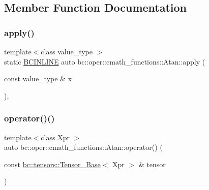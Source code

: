 \subsection{Member Function Documentation}
\mbox{\label{structbc_1_1oper_1_1cmath__functions_1_1Atan_a8ee1b987b30be5bd14dfd71f6f112fbe}} 
\subsubsection{\texorpdfstring{apply()}{apply()}}
{\footnotesize\ttfamily template$<$class value\+\_\+type $>$ \\
static \hyperlink{common_8h_a6699e8b0449da5c0fafb878e59c1d4b1}{B\+C\+I\+N\+L\+I\+NE} auto bc\+::oper\+::cmath\+\_\+functions\+::\+Atan\+::apply (\begin{DoxyParamCaption}\item[{const value\+\_\+type \&}]{x }\end{DoxyParamCaption})\hspace{0.3cm}{\ttfamily [inline]}, {\ttfamily [static]}}

\mbox{\label{structbc_1_1oper_1_1cmath__functions_1_1Atan_a8886ec51e68cc92caba84b031d3acdf9}} 
\subsubsection{\texorpdfstring{operator()()}{operator()()}\hspace{0.1cm}{\footnotesize\ttfamily [1/3]}}
{\footnotesize\ttfamily template$<$class Xpr $>$ \\
auto bc\+::oper\+::cmath\+\_\+functions\+::\+Atan\+::operator() (\begin{DoxyParamCaption}\item[{const \hyperlink{classbc_1_1tensors_1_1Tensor__Base}{bc\+::tensors\+::\+Tensor\+\_\+\+Base}$<$ Xpr $>$ \&}]{tensor }\end{DoxyParamCaption})\hspace{0.3cm}{\ttfamily [inline]}}

